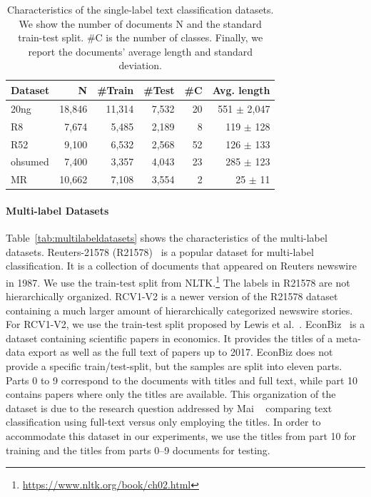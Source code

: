 \begin{table}[ht]
    \centering
    \caption{Characteristics of the single-label text classification datasets. 
    We show the number of documents N and
    the standard train-test split.
    \#C is the number of classes.
    Finally, we report the documents' average length and standard deviation.
    }
    \label{tab:datasets}
    \begin{tabular}{lrrrrr}
    \toprule
    \textbf{Dataset} & \textbf{N}       & \textbf{\#Train} & \textbf{\#Test}  & \textbf{\#C} & \textbf{Avg. length}   \\
    \midrule                                                              
    20ng    & 18,846  & 11,314  & 7,532   & 20        & 551 $\pm$ 2,047 \\
    R8      & 7,674   & 5,485   & 2,189   & 8         & 119 $\pm$ 128   \\
    R52     & 9,100   & 6,532   & 2,568   & 52        & 126 $\pm$ 133   \\
    ohsumed & 7,400   & 3,357   & 4,043   & 23        & 285 $\pm$ 123   \\
    MR      & 10,662  & 7,108   & 3,554   & 2         & 25 $\pm$ 11     \\
    \bottomrule
    \end{tabular}
\end{table}

\paragraph{Multi-label Datasets}
\label{sec:multi-label-datasets}
Table~\ref{tab:multilabeldatasets} shows the characteristics of the multi-label datasets.
Reuters-21578 (R21578)~\cite{reuters} is a popular dataset for multi-label classification. It is a collection of documents that appeared on Reuters newswire in 1987. We use the train-test split from NLTK.\footnote{\url{https://www.nltk.org/book/ch02.html}}
The labels in R21578 are not hierarchically organized.
RCV1-V2 is a newer version of the R21578 dataset containing a much larger amount of hierarchically categorized newswire stories. 
For RCV1-V2, we use the train-test split proposed by Lewis et al.~\cite{rcv1-v2}. 
EconBiz~\cite{DBLP:conf/jcdl/MaiGS18} is a dataset containing scientific papers in economics.
It provides the titles of a meta-data export as well as the full text of papers up to 2017. 
EconBiz does not provide a specific train/test-split, but the samples are split into eleven parts. 
Parts 0 to 9 correspond to the documents with titles and full text, while part 10 contains papers where only the titles are available.
This organization of the dataset is due to the research question addressed by Mai \etal~\cite{DBLP:conf/jcdl/MaiGS18} comparing text classification using full-text versus only employing the titles.
In order to accommodate this dataset in our experiments, we use the titles from part 10 for training and the titles from parts 0--9 documents for testing. 

